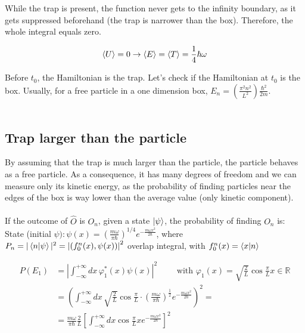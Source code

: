 \noindent
While the trap is present, the function never gets to the infinity boundary, as it gets suppressed beforehand (the trap is narrower than the box).
Therefore, the whole integral equals zero.

$$\expval{U}=0 \rightarrow \expval{E}=\expval{T}=\frac{1}{4} \hbar \omega $$

\noindent
Before $t_0$, the Hamiltonian is the trap.
Let's check if the Hamiltonian at $t_0$ is the box.
Usually, for a free particle in a one dimension box,  $E_n=\left(\frac{\pi^{2}n^2}{L^2}\right)\frac{\hbar^{2}}{2 m}$.\\
\\

	\subsection{Trap larger than the particle}
	By assuming that the trap is much larger than the particle, the particle behaves as a free particle.
	As a consequence, it has many degrees of freedom and we can measure only its kinetic energy, as the probability of finding particles near the edges of the box is way lower than the average value (only kinetic component).\\
	\\
	\noindent
	If the outcome of $\hat{O}$ is $O_n$, given a state $\ket{\psi}$, the probability of finding $O_n$ is:
	\\
	State (initial $\psi): \psi(x)=\left(\frac{m \omega}{ \pi \hbar}\right)^{1 / 4} e^{-\frac{m \omega x^{2}}{2 \hbar}}$, where $P_{n}=|\bra{n} \ket{\psi}|^{2}=\left|\left(f_{0}^{n}(x), \psi(x)\right)\right|^{2}$ overlap integral, with $f_{0}^{n}(x)=\bra{x}\ket{n}$

	\begin{align*}
		P\left(E_{1}\right)&=\left|\int_{-\infty}^{+\infty} d x\, \varphi_{1}^{*}(x) \psi(x)\right|^{2}\qquad \text{ with }\varphi_{1}(x)=\sqrt{\frac{2}{L}} \cos \frac{\pi}{L}x \in \mathbb{R}\\
		&=\left(\int_{-\infty}^{+\infty} d x\,\sqrt{\frac{2}{L}} \cos \frac{\pi}{L} \cdot \left(\frac{m \omega}{ \pi \hbar}\right)^{\frac{1}{2}} e^{-\frac{m \omega x^{2}}{2 \hbar}}\right)^{2}=\\
															&=\frac{m \omega}{ \pi \hbar}\frac{2}{L} \left[\int_{-\infty}^{+\infty} d x \cos \frac{\pi}{L} x e^{-\frac{m \omega x^{2}}{2 \hbar}}\right]^{2}
	\end{align*}

	\noindent

